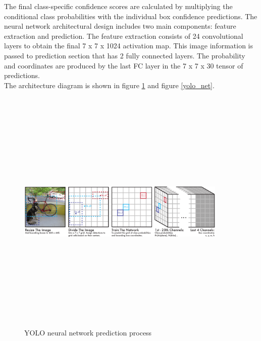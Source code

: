 The final class-specific confidence scores are calculated by multiplying the conditional class probabilities with the individual box confidence predictions. The neural network architectural design includes two main components: feature extraction and prediction. The feature extraction consists of 24 convolutional layers to obtain the final 7 x 7 x 1024 activation map. This image information is passed to prediction section that has 2 fully connected layers. The probability and coordinates are produced by the last FC layer in the 7 x 7 x 30 tensor of predictions.\\

\newpage
The architecture diagram is shown in figure \ref{yolo_model} and figure \ref{yolo_net}. 

\begin{figure}[h]
\setlength{\belowcaptionskip}{-30pt}
\centering
\includegraphics[width=10cm,height=12cm,keepaspectratio]{figures/yolo_model.png}
\caption{YOLO neural network prediction process}
\label{yolo_model}
\end{figure}

